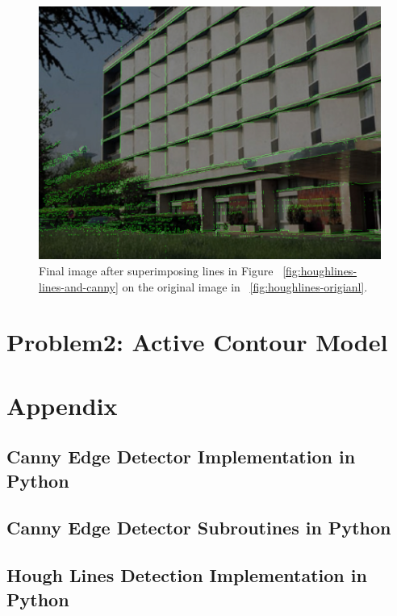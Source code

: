 \documentclass[journal,9pt,onecolumn,draftclsnofoot]{ieeeconf} %
\begin{document}
\begin{figure}[h!]
\includegraphics[width=0.4\paperwidth]{hough-lines/final-image.jpg}
\caption{Final image after superimposing lines in Figure ~\ref{fig:houghlines-lines-and-canny} on the original image in ~\ref{fig:houghlines-origianl}. }
\label{fig:houghlines-final}
\end{figure}



\section*{Problem2: Active Contour Model}


\section*{Appendix }
\subsection*{Canny Edge Detector Implementation in Python}\label{appendix:canny-main}

\subsection*{Canny Edge Detector Subroutines in Python}\label{appendix:canny-details}

\subsection*{Hough Lines Detection Implementation in Python}\label{appendix:hough-details}
\end{document}
